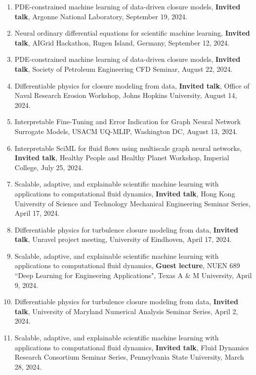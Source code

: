 \documentclass[letterpaper]{article}
\begin{document}
\begin{enumerate}
\item PDE-constrained machine learning of data-driven closure models, \textbf{Invited talk}, Argonne National Laboratory, September 19, 2024.

\item Neural ordinary differential equations for scientific machine learning, \textbf{Invited talk}, AIGrid Hackathon, Rugen Island, Germany, September 12, 2024.

\item PDE-constrained machine learning of data-driven closure models, \textbf{Invited talk}, Society of Petroleum Engineering CFD Seminar, August 22, 2024.

\item Differentiable physics for closure modeling from data, \textbf{Invited talk}, Office of Naval Research Erosion Workshop, Johns Hopkins University, August 14, 2024.

\item Interpretable Fine-Tuning and Error Indication for Graph Neural Network Surrogate Models, USACM UQ-MLIP, Washington DC, August 13, 2024.

\item Interpretable SciML for fluid flows using multiscale graph neural networks, \textbf{Invited talk}, Healthy People and Healthy Planet Workshop, Imperial College, July 25, 2024.

\item Scalable, adaptive, and explainable scientific machine learning with applications to computational fluid dynamics, \textbf{Invited talk}, Hong Kong University of Science and Technology Mechanical Engineering Seminar Series, April 17, 2024.

\item Differentiable physics for turbulence closure modeling from data, \textbf{Invited talk}, Unravel project meeting, University of Eindhoven, April 17, 2024.

\item Scalable, adaptive, and explainable scientific machine learning with applications to computational fluid dynamics, \textbf{Guest lecture}, NUEN 689 ``Deep Learning for Engineering Applications", Texas A \& M University, April 9, 2024.

\item Differentiable physics for turbulence closure modeling from data, \textbf{Invited talk}, University of Maryland Numerical Analysis Seminar Series, April 2, 2024.

\item Scalable, adaptive, and explainable scientific machine learning with applications to computational fluid dynamics, \textbf{Invited talk}, Fluid Dynamics Research Consortium Seminar Series, Pennsylvania State University, March 28, 2024.


\end{enumerate}
\end{document}
